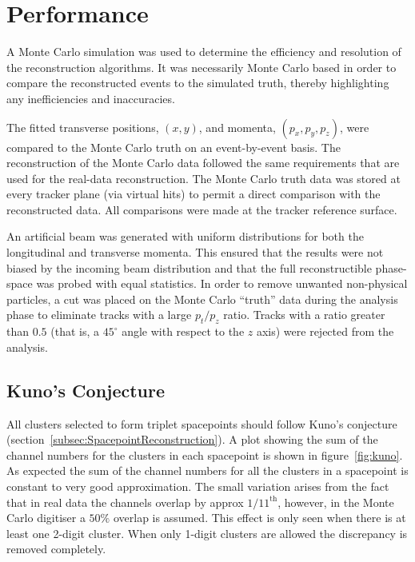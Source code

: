 \section{Performance}
\label{sec:Performance}

  A Monte Carlo simulation was used to determine the efficiency and resolution of the reconstruction algorithms. It was necessarily Monte Carlo based in order to compare the reconstructed events to the simulated truth, thereby highlighting any inefficiencies and inaccuracies.

  The fitted transverse positions, $(x,y)$, and momenta, $(p_x, p_y, p_z)$, were compared to the Monte Carlo truth on an event-by-event basis. The reconstruction of the Monte Carlo data followed the same requirements that are used for the real-data reconstruction. The Monte Carlo truth data was stored at every tracker plane (via virtual hits) to permit a direct comparison with the reconstructed data. All comparisons were made at the tracker reference surface. %

  An artificial beam was generated with uniform distributions for both the longitudinal and transverse momenta. This ensured that the results were not biased by the incoming beam distribution and that the full reconstructible phase-space was probed with equal statistics. In order to remove unwanted non-physical particles, a cut was placed on the Monte Carlo ``truth'' data during the analysis phase to eliminate tracks with a large $p_t/p_z$ ratio. Tracks with a ratio greater than $0.5$ (that is, a $45^\circ$ angle with respect to the $z$ axis) were rejected from the analysis.
  
  \subsection{Kuno's Conjecture}
  \label{sec:performance:kunos_conjecture}
  
  All clusters selected to form triplet spacepoints should follow Kuno's conjecture (section~\ref{subsec:SpacepointReconstruction}). A plot showing the sum of the channel numbers for the clusters in each spacepoint is shown in figure~\ref{fig:kuno}. As expected the sum of the channel numbers for all the clusters in a spacepoint is constant to very good approximation.  The small variation arises from the fact that in real data the channels overlap by approx $1/11^{\mathrm{th}}$, however, in the Monte Carlo digitiser a $50\%$ overlap is assumed. This effect is only seen when there is at least one 2-digit cluster. When only 1-digit clusters are allowed the discrepancy is removed completely.

